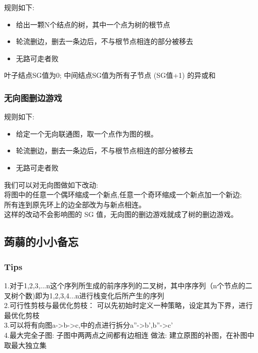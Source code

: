 \documentclass{article}
\begin{document}
规则如下:
\begin{itemize}
\item 给出一颗N个结点的树，其中一个点为树的根节点
\item 轮流删边，删去一条边后，不与根节点相连的部分被移去
\item 无路可走者败
\end{itemize}

叶子结点SG值为0; 中间结点SG值为所有子节点 (SG值+1) 的异或和

\subsubsection{无向图删边游戏}

规则如下:
\begin{itemize}
\item 给定一个无向联通图，取一个点作为图的根。
\item 轮流删边，删去一条边后，不与根节点相连的部分被移去
\item 无路可走者败
\end{itemize}

我们可以对无向图做如下改动:	\\
将图中的任意一个偶环缩成一个新点,任意一个奇环缩成一个新点加一个新边;	\\
所有连到原先环上的边全部改为与新点相连。	\\
这样的改动不会影响图的 SG 值，无向图的删边游戏就成了树的删边游戏。	\\


\newpage
\subsection{蒟蒻的小小备忘}
\subsubsection{Tips}
1.对于1,2,3,...n这个序列所生成的前序序列的二叉树，其中序序列（n个节点的二叉树个数)即为1,2,3,4...n进行栈变化后所产生的序列 \\

2.可行性剪枝与最优化剪枝： 可以先初始时定义一种策略，设定其为下界，进行最优化剪枝 \\

3.可以将有向图a->b->c,中的点进行拆分a''->b',b''->c'　\\

4.最大完全子图: 子图中两两点之间都有边相连  做法: 建立原图的补图，在补图中取最大独立集 \\
\end{document}
